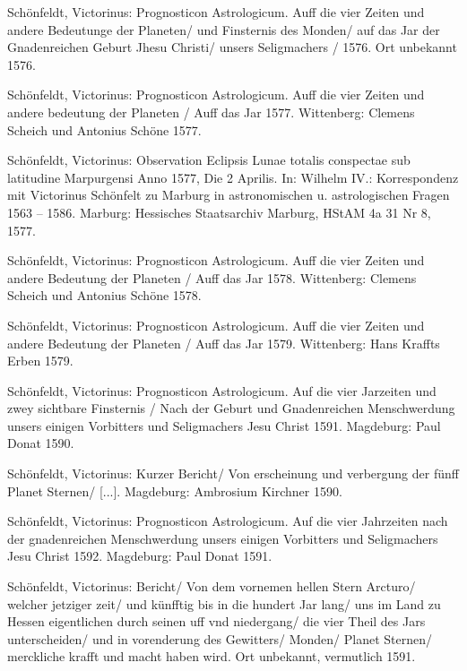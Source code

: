 \documentclass[12pt]{article}
\begin{document}
\begin{thebibliography}{}
 Schönfeldt, Victorinus: Prognosticon Astrologicum. Auff die vier Zeiten und andere Bedeutunge der Planeten/ und Finsternis des Monden/ auf das Jar der Gnadenreichen Geburt Jhesu Christi/
unsers Seligmachers / 1576. Ort unbekannt 1576. 	

 Schönfeldt, Victorinus:
Prognosticon Astrologicum. Auff die vier Zeiten und andere bedeutung der Planeten / Auff das Jar  1577. Wittenberg: Clemens Scheich und Antonius Schöne 1577. 

 Schönfeldt, Victorinus: Observation Eclipsis Lunae totalis conspectae sub latitudine Marpurgensi
Anno 1577, Die 2 Aprilis. In: Wilhelm IV.: Korrespondenz mit Victorinus Schönfelt zu Marburg in astronomischen u. astrologischen Fragen 1563 – 1586. Marburg: Hessisches Staatsarchiv Marburg, HStAM 4a 31 Nr 8, 1577.

 Schönfeldt, Victorinus:
Prognosticon Astrologicum. Auff die vier Zeiten und andere Bedeutung der Planeten / Auff das Jar  1578. Wittenberg: Clemens Scheich und Antonius Schöne 1578. 

 Schönfeldt, Victorinus:
Prognosticon Astrologicum. Auff die vier Zeiten und andere Bedeutung der Planeten / Auff das Jar  1579. Wittenberg: Hans Kraffts Erben 1579. 

 Schönfeldt, Victorinus: Prognosticon Astrologicum. Auf die vier Jarzeiten und zwey sichtbare Finsternis / Nach der Geburt und Gnadenreichen Menschwerdung unsers einigen Vorbitters und Seligmachers Jesu Christ 1591. Magdeburg: Paul Donat 1590. 	

 Schönfeldt, Victorinus: Kurzer Bericht/ Von erscheinung und verbergung der fünff Planet Sternen/ [...]. Magdeburg: Ambrosium Kirchner 1590.

 Schönfeldt, Victorinus: Prognosticon Astrologicum. Auf die vier Jahrzeiten nach der gnadenreichen Menschwerdung unsers einigen Vorbitters und Seligmachers Jesu Christ 1592. Magdeburg: Paul Donat 1591. 

 Schönfeldt, Victorinus: Bericht/ Von dem vornemen hellen Stern Arcturo/ welcher jetziger zeit/ und künfftig bis in die hundert Jar lang/ uns im Land zu Hessen eigentlichen durch seinen uff vnd niedergang/ die vier Theil des Jars unterscheiden/ und in vorenderung des Gewitters/ Monden/ Planet Sternen/ merckliche krafft und macht haben wird. Ort unbekannt, vermutlich 1591.


\end{thebibliography}
\end{document}
